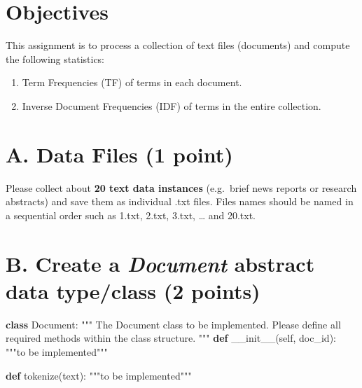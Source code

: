 \documentclass[
  letterpaper,
]{scrbook}
\newenvironment{Shaded}{\begin{snugshade}}{\end{snugshade}}
\newcommand{\CommentTok}[1]{\textcolor[rgb]{0.37,0.37,0.37}{#1}}
\newcommand{\FunctionTok}[1]{\textcolor[rgb]{0.28,0.35,0.67}{#1}}
\newcommand{\KeywordTok}[1]{\textcolor[rgb]{0.00,0.23,0.31}{\textbf{#1}}}
\newcommand{\NormalTok}[1]{\textcolor[rgb]{0.00,0.23,0.31}{#1}}
\newcommand{\VariableTok}[1]{\textcolor[rgb]{0.07,0.07,0.07}{#1}}
\providecommand{\tightlist}{%
  \setlength{\itemsep}{0pt}\setlength{\parskip}{0pt}}
\begin{document}
\section*{Objectives}\label{objectives-2}


This assignment is to process a collection of text files (documents) and
compute the following statistics:

\begin{enumerate}
\def\labelenumi{\arabic{enumi}.}
\tightlist
\item
  Term Frequencies (TF) of terms in each document.
\item
  Inverse Document Frequencies (IDF) of terms in the entire collection.
\end{enumerate}

\section*{A. Data Files (1 point)}\label{a.-data-files-1-point}


Please collect about \textbf{20 text data instances} (e.g.~brief news
reports or research abstracts) and save them as individual .txt files.
Files names should be named in a sequential order such as 1.txt, 2.txt,
3.txt, \ldots{} and 20.txt.

\section*{\texorpdfstring{B. Create a \emph{Document} abstract data
type/class (2
points)}{B. Create a Document abstract data type/class (2 points)}}\label{b.-create-a-document-abstract-data-typeclass-2-points}


\begin{Shaded}
\begin{Highlighting}[]
\KeywordTok{class}\NormalTok{ Document: }
    \CommentTok{"""}
\CommentTok{    The Document class to be implemented. }
\CommentTok{    Please define all required methods }
\CommentTok{    within the class structure. }
\CommentTok{    """}
    \KeywordTok{def} \FunctionTok{\_\_init\_\_}\NormalTok{(}\VariableTok{self}\NormalTok{, doc\_id):}
        \CommentTok{"""to be implemented"""}
    
    \KeywordTok{def}\NormalTok{ tokenize(text):}
        \CommentTok{"""to be implemented"""}
\end{Highlighting}
\end{Shaded}
\end{document}
